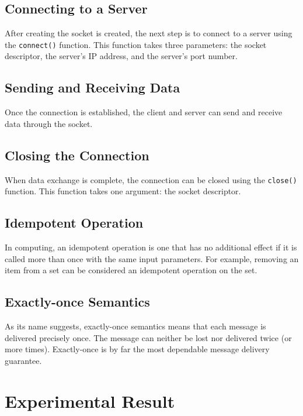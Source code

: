 \documentclass[11pt]{article}
\begin{document}
\subsection{Connecting to a Server}

After creating the socket is created, the next step is to connect to a server using the \texttt{connect()} function. This function takes three parameters: the socket descriptor, the server's IP address, and the server's port number.

\subsection{Sending and Receiving Data}

Once the connection is established, the client and server can send and receive data through the socket.

\subsection{Closing the Connection}

When data exchange is complete, the connection can be closed using the \texttt{close()} function. This function takes one argument: the socket descriptor.

\subsection{Idempotent Operation}

In computing, an idempotent operation is one that has no additional effect if it is called more than once with the same input parameters. For example, removing an item from a set can be considered an idempotent operation on the set.

\subsection{Exactly-once Semantics}

As its name suggests, exactly-once semantics means that each message is delivered precisely once. The message can neither be lost nor delivered twice (or more times). Exactly-once is by far the most dependable message delivery guarantee.




\section{Experimental Result}
\end{document}
